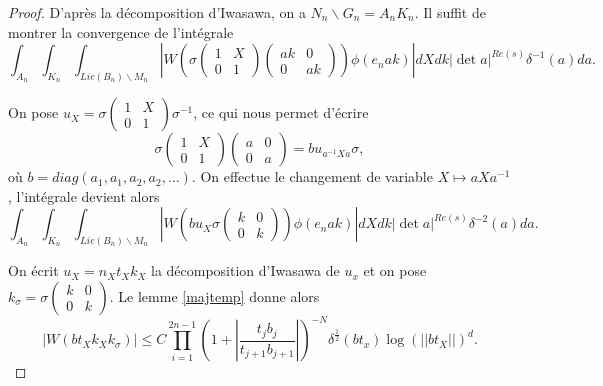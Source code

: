\documentclass{amsart}
\begin{document}
 \begin{proof}
 D'après la décomposition d'Iwasawa, on a $N_n\backslash{G_n} = A_nK_n$. Il suffit de montrer la convergence de l'intégrale
 \begin{equation}
 \int_{A_n} \int_{K_n} \int_{Lie(B_n)\backslash{M_n}} \left|W\left(\sigma \begin{pmatrix}
1 & X \\
0 & 1
\end{pmatrix}\begin{pmatrix}
ak & 0 \\
0 & ak
\end{pmatrix}\right) \phi(e_nak)\right| dX dk \left|\det a\right|^{Re(s)} \delta^{-1}(a) da.
 \end{equation}
 
 On pose $u_X = \sigma \begin{pmatrix}
1 & X \\
0 & 1
\end{pmatrix} \sigma^{-1}$, ce qui nous permet d'écrire
\begin{equation}
\sigma \begin{pmatrix}
1 & X \\
0 & 1
\end{pmatrix}\begin{pmatrix}
a & 0 \\
0 & a
\end{pmatrix} = b u_{a^{-1}Xa} \sigma,
\end{equation}
 où $b=diag(a_1,a_1,a_2,a_2,...)$. On effectue le changement de variable $X \mapsto aXa^{-1}$, l'intégrale devient alors
 \begin{equation}
\int_{A_n} \int_{K_n} \int_{Lie(B_n)\backslash{M_n}} \left|W\left(b u_X \sigma \begin{pmatrix}
k & 0 \\
0 & k
\end{pmatrix}\right)\phi(e_nak)\right|dX dk |\det a|^{Re(s)} \delta^{-2}(a) da.
 \end{equation}
 
 On écrit $u_X = n_Xt_Xk_X$ la décomposition d'Iwasawa de $u_x$ et on pose $k_\sigma = \sigma \begin{pmatrix}
k & 0 \\
0 & k
\end{pmatrix}$. Le lemme \ref{majtemp} donne alors
 \begin{equation}
 |W(bt_Xk_Xk_\sigma)| \leq C \prod_{i=1}^{2n-1} (1+  |\frac{t_jb_j}{t_{j+1}b_{j+1}}|)^{-N} \delta^{\frac{1}{2}}(bt_x)\log(||bt_X||)^d.
 \end{equation}
 

\end{proof}
\end{document}
